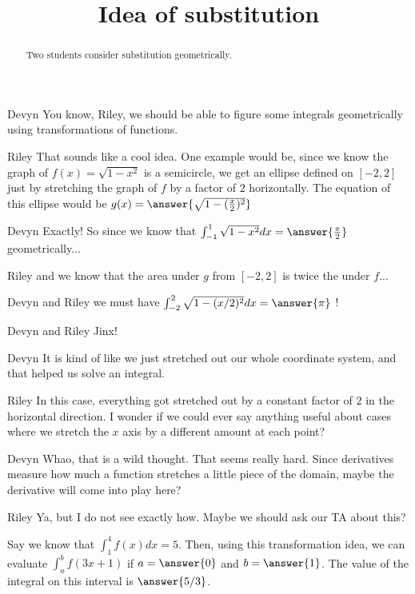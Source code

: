 \documentclass{ximera}
\title[Break-Ground:]{Idea of substitution}
\begin{document}
\begin{abstract}
Two students consider substitution geometrically.
\end{abstract}
\maketitle









\begin{dialogue}
\item[Devyn] You know, Riley, we should be able to figure some integrals geometrically using transformations of functions.
\item[Riley] That sounds like a cool idea.  One example would be, since we know the graph of $f(x) = \sqrt{1-x^2}$ is a semicircle, we get an ellipse defined on $[-2,2]$ just by stretching the graph of $f$ by a factor of $2$ horizontally.  The equation of this ellipse would be $g(x) = \answer{\sqrt{1-(\frac{x}{2})^2}}$
\item[Devyn] Exactly!  So since we know that $\int_{-1}^1 \sqrt{1-x^2} dx = \answer{\frac{\pi}{2}}$ geometrically...
\item[Riley] and we know that the area under $g$ from $[-2,2]$ is twice the under $f$...
\item[Devyn and Riley] we must have $\int_{-2}^2 \sqrt{1-(x/2)^2} dx =  \answer{\pi}$ !
\item[Devyn and Riley] Jinx!
\item[Devyn] It is kind of like we just stretched out our whole coordinate system, and that helped us solve an integral.
\item[Riley] In this case, everything got stretched out by a constant factor of $2$ in the horizontal direction.  I wonder if we could ever say anything useful about cases where we stretch the $x$ axis by a different amount at each point?
\item[Devyn] Whao, that is a wild thought.  That seems really hard.  Since derivatives measure how much a function stretches a little piece of the domain, maybe the derivative will come into play here?
\item[Riley] Ya, but I do not see exactly how.  Maybe we should ask our TA about this?
\end{dialogue}

\begin{question}
Say we know that $\int_1^4 f(x) dx = 5$.  Then, using this transformation idea, we can evaluate $\int_a^b f(3x+1)$ if $a= \answer{0}$ and $b=\answer{1}$.  The value of the integral on this interval is $\answer{5/3}$.
\end{question}


\end{document}
